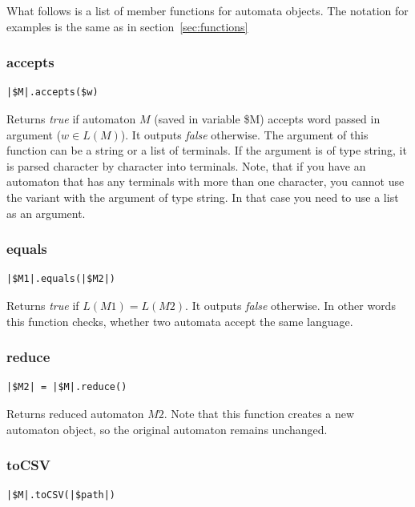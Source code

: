 \documentclass{ctuthesis}
\begin{document}
What follows is a list of member functions for automata objects. The notation for examples is the same as in section~\ref{sec:functions}

\subsubsection{accepts}
\begin{lstlisting}[language = JASL_snippet]
	|$M|.accepts($w)
\end{lstlisting}

Returns \textit{true} if automaton $M$ (saved in variable \$M) accepts word passed in argument ($w \in L(M)$). It outputs \textit{false} otherwise. The argument of this function can be a string or a list of terminals. If the argument is of type string, it is parsed character by character into terminals. Note, that if you have an automaton that has any terminals with more than one character, you cannot use the variant with the argument of type string. In that case you need to use a list as an argument.

\subsubsection{equals}
\begin{lstlisting}[language = JASL_snippet]
	|$M1|.equals(|$M2|)
\end{lstlisting}

Returns \textit{true} if $L(M1) = L(M2)$. It outputs \textit{false} otherwise. In other words this function checks, whether two automata accept the same language. 

\subsubsection{reduce}
\begin{lstlisting}[language = JASL_snippet]
	|$M2| = |$M|.reduce()
\end{lstlisting}

Returns reduced automaton $M2$. Note that this function creates a new automaton object, so the original automaton remains unchanged.

\subsubsection{toCSV}
\begin{lstlisting}[language = JASL_snippet]
	|$M|.toCSV(|$path|)
\end{lstlisting}
\end{document}
